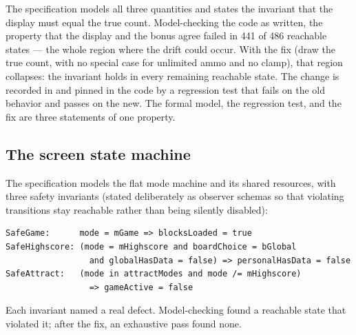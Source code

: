 \documentclass[11pt,a4paper]{article}
\begin{document}
The specification  models all three
quantities and states the invariant that the display must equal the true
count. Model-checking the code as written, the property that the display and
the bonus agree failed in 441 of 486 reachable states --- the whole region
where the drift could occur. With the fix (draw the true count, with no
special case for unlimited ammo and no clamp), that region collapses: the
invariant holds in every remaining reachable state. The change is
recorded in  and pinned in the code by a regression test that
fails on the old behavior and passes on the new. The formal model, the
regression test, and the fix are three statements of one property.

\subsection{The screen state machine}

The specification 
models the flat mode machine and its shared resources, with three safety
invariants (stated deliberately as observer schemas so that violating
transitions stay reachable rather than being silently disabled):

\begin{lstlisting}[caption={Screen-machine safety invariants (Z)}, label={lst:zschema}]
SafeGame:      mode = mGame => blocksLoaded = true
SafeHighscore: (mode = mHighscore and boardChoice = bGlobal
                 and globalHasData = false) => personalHasData = false
SafeAttract:   (mode in attractModes and mode /= mHighscore)
                 => gameActive = false
\end{lstlisting}

Each invariant named a real defect. Model-checking found a reachable state
that violated it; after the fix, an exhaustive pass found none.
\end{document}
